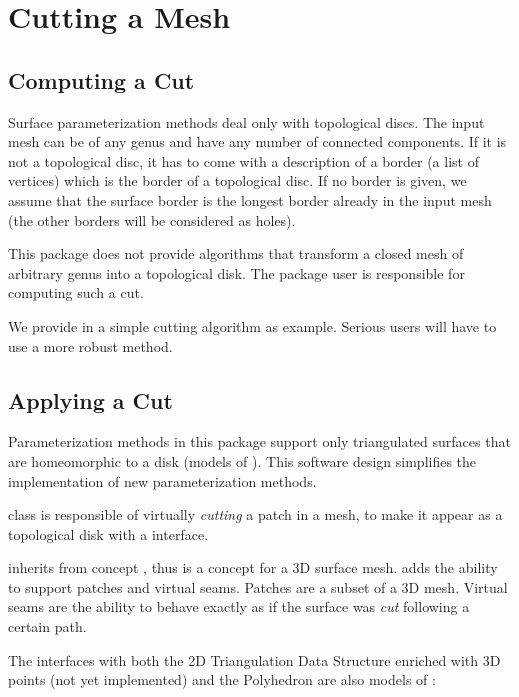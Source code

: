 \section{Cutting a Mesh}

\subsection{Computing a Cut}

Surface parameterization methods deal only with topological discs.
The input mesh can be of any genus and have any number of connected components.
If it is not a topological disc, it has to come with a description of a border
(a list of vertices) which is the border of a topological disc.
If no border is given, we assume that the surface border
is the longest border already in the input mesh (the other borders will
be considered as holes).

This package does not provide algorithms that transform
a closed mesh of arbitrary genus into a topological disk.
The package user is responsible for computing such a cut.

We provide in  a simple cutting algorithm as example.
Serious users will have to use a more robust method.


\subsection{Applying a Cut}

Parameterization methods in this package support only
triangulated surfaces that are homeomorphic to a
disk (models of ). This software design simplifies the implementation of new
parameterization methods.

 class is responsible of virtually {\em cutting}
a patch in a  mesh, to make it appear as a topological disk
with a  interface.

 inherits from concept , thus is a concept for a 3D surface mesh.
 adds the ability to support patches and virtual seams. Patches are a subset of a 3D mesh. Virtual seams are the ability to behave exactly as if the surface was {\em cut} following a certain path.

The  interfaces with both the 2D Triangulation Data Structure enriched
with 3D points (not yet implemented) and the Polyhedron are also models of :

